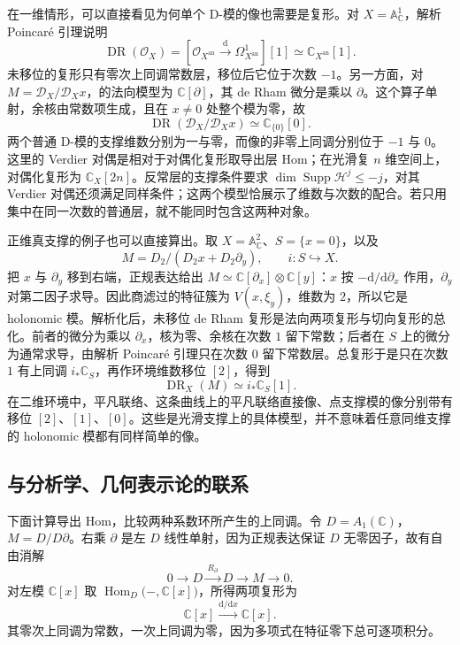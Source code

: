 在一维情形，可以直接看见为何单个 D-模的像也需要是复形。对 \(X=\mathbb A^1_{\mathbb C}\)，解析 Poincaré 引理说明
\[
	\operatorname{DR}(\mathcal O_X) =[\mathcal O_{X^{\mathrm{an}}}\xrightarrow{\,\mathrm{d}\,} \Omega^1_{X^{\mathrm{an}}}][1] \simeq\mathbb C_{X^{\mathrm{an}}}[1].
\]
未移位的复形只有零次上同调常数层，移位后它位于次数 \(-1\)。另一方面，对 \(M=\mathcal D_X/\mathcal D_Xx\)，的法向模型为 \(\mathbb C[\partial]\)，其 de Rham 微分是乘以 \(\partial\)。这个算子单射，余核由常数项生成，且在 \(x\ne0\) 处整个模为零，故
\[
	\operatorname{DR}(\mathcal D_X/\mathcal D_Xx) \simeq\mathbb C_{\{0\}}[0].
\]
两个普通 D-模的支撑维数分别为一与零，而像的非零上同调分别位于 \(-1\) 与 \(0\)。这里的 Verdier 对偶是相对于对偶化复形取导出层 Hom；在光滑复 \(n\) 维空间上，对偶化复形为 \(\mathbb C_X[2n]\)。反常层的支撑条件要求 \(\dim\operatorname{Supp}\mathcal H^j\le-j\)，对其 Verdier 对偶还须满足同样条件；这两个模型恰展示了维数与次数的配合。若只用集中在同一次数的普通层，就不能同时包含这两种对象。

\ProseParagraphBreak
正维真支撑的例子也可以直接算出。取 \(X=\mathbb A^2_{\mathbb C}\)、\(S=\{x=0\}\)，以及
\[
	M=D_2/(D_2x+D_2\partial_y),\qquad i:S\hookrightarrow X.
\]
把 \(x\) 与 \(\partial_y\) 移到右端，正规表达给出 \(M\simeq\mathbb C[\partial_x]\otimes\mathbb C[y]\)：\(x\) 按 \(-\mathrm{d}/\mathrm{d}\partial_x\) 作用，\(\partial_y\) 对第二因子求导。因此商滤过的特征簇为 \(V(x,\xi_y)\)，维数为 \(2\)，所以它是 holonomic 模。解析化后，未移位 de Rham 复形是法向两项复形与切向复形的总化。前者的微分为乘以 \(\partial_x\)，核为零、余核在次数 \(1\) 留下常数；后者在 \(S\) 上的微分为通常求导，由解析 Poincaré 引理只在次数 \(0\) 留下常数层。总复形于是只在次数 \(1\) 有上同调 \(i_*\mathbb C_S\)，再作环境维数移位 \([2]\)，得到
\[
	\operatorname{DR}_X(M)\simeq i_*\mathbb C_S[1].
\]
在二维环境中，平凡联络、这条曲线上的平凡联络直接像、点支撑模的像分别带有移位 \([2]\)、\([1]\)、\([0]\)。这些是光滑支撑上的具体模型，并不意味着任意同维支撑的 holonomic 模都有同样简单的像。

\subsection{与分析学、几何表示论的联系}
\label{b5:subsec:D02:04}

下面计算导出 Hom，比较两种系数环所产生的上同调。令 \(D=A_1(\mathbb C)\)，\(M=D/D\partial\)。右乘 \(\partial\) 是左 \(D\) 线性单射，因为正规表达保证 \(D\) 无零因子，故有自由消解
\[
	0\longrightarrow D\xrightarrow{\,R_\partial\,}D\longrightarrow M\longrightarrow0.
\]
对左模 \(\mathbb C[x]\) 取 \(\operatorname{Hom}_D\bigl(-,\mathbb C[x]\bigr)\)，所得两项复形为
\[
	\mathbb C[x]\xrightarrow{\mathrm{d}/\mathrm{d}x}\mathbb C[x].
\]
其零次上同调为常数，一次上同调为零，因为多项式在特征零下总可逐项积分。

